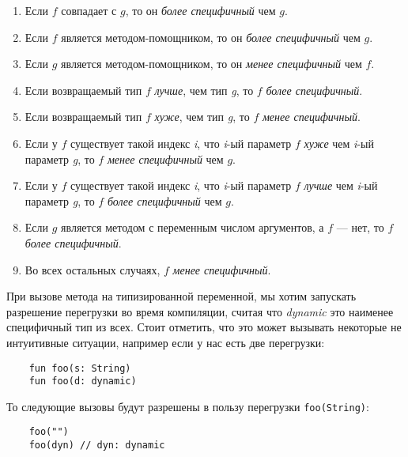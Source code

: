 \begin{enumerate}
    \item Если $f$ совпадает с $g$, то он \textit{более специфичный} чем $g$.
    \item Если $f$ является методом-помощником, то он \textit{более специфичный} чем $g$.
    \item Если $g$ является методом-помощником, то он \textit{менее специфичный} чем $f$.
    \item Если возвращаемый тип $f$ \textit{лучше}, чем тип \textit{g}, то $f$ \textit{более специфичный}.
    \item Если возвращаемый тип $f$ \textit{хуже}, чем тип \textit{g}, то $f$ \textit{менее специфичный}.
    \item Если у $f$ существует такой индекс \textit{i}, что \textit{i}-ый параметр $f$ \textit{хуже} чем \textit{i}-ый параметр \textit{g}, то $f$ \textit{менее специфичный} чем $g$.
    \item Если у $f$ существует такой индекс \textit{i}, что \textit{i}-ый параметр $f$ \textit{лучше} чем \textit{i}-ый параметр \textit{g}, то $f$ \textit{более специфичный} чем $g$.
    \item Если $g$ является методом с переменным числом аргументов, а $f$ --- нет, то $f$ \textit{более специфичный}.
    \item Во всех остальных случаях, $f$ \textit{менее специфичный}.
\end{enumerate}

При вызове метода на типизированной переменной, мы хотим запускать разрешение перегрузки во время компиляции, считая что \textit{dynamic} это наименее специфичный тип из всех. Стоит отметить, что это может вызывать некоторые не интуитивные ситуации, например если у нас есть две перегрузки:

\begin{verbatim}
    fun foo(s: String)
    fun foo(d: dynamic)
\end{verbatim} 

То следующие вызовы будут разрешены в пользу перегрузки \texttt{foo(String)}:

\begin{verbatim}
    foo("")
    foo(dyn) // dyn: dynamic
\end{verbatim} 

